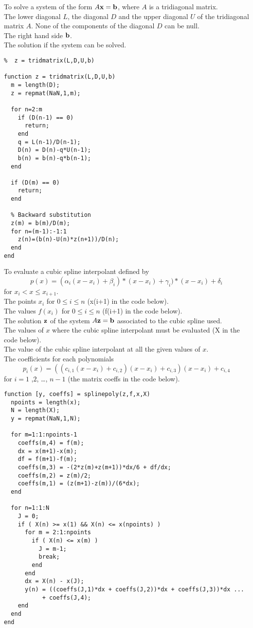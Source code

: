 \begin{code}
To solve a system of the form $A\mathbf{x} = \mathbf{b}$, where $A$ is a
tridiagonal matrix.\\
 The lower diagonal $L$, the diagonal $D$ and the upper
diagonal $U$ of the tridiagonal matrix $A$.  None of the components of
the diagonal $D$ can be null.\\
The right hand side $\mathbf{b}$.\\
 The solution if the system can be solved.
\small
\begin{verbatim}
%  z = tridmatrix(L,D,U,b)

function z = tridmatrix(L,D,U,b)
  m = length(D);
  z = repmat(NaN,1,m);

  for n=2:m
    if (D(n-1) == 0)
      return;
    end
    q = L(n-1)/D(n-1);
    D(n) = D(n)-q*U(n-1);
    b(n) = b(n)-q*b(n-1);
  end

  if (D(m) == 0)
    return;
  end

  % Backward substitution
  z(m) = b(m)/D(m);
  for n=(m-1):-1:1
    z(n)=(b(n)-U(n)*z(n+1))/D(n);
  end
end
\end{verbatim}
\end{code}

\begin{code}
To evaluate a cubic spline interpolant defined by
\[
  p(x) = (\alpha_i(x-x_i) + \beta_i)*(x-x_i) + \gamma_i)*(x-x_i) + \delta_i
\]
for $x_i < x \leq x_{i+1}$.\\
 The points $x_i$ for $0 \leq i \leq n$ (x(i+1) in the
code below).\\
The values $f(x_i)$ for $0 \leq i \leq n$ (f(i+1) in the code
below).\\
The solution $\mathbf{z}$ of the system $A \mathbf{z} = \mathbf{b}$ associated
to the cubic spline used.\\
The values of $x$ where the cubic spline interpolant must
be evaluated (X in the code below).\\
 The value of the cubic spline interpolant at all the
given values of $x$.\\
The coefficients for each polynomials
\[
  p_i(x) = ((c_{i,1} (x-x_i) + c_{i,2})(x-x_i) + c_{i,3})(x-x_i) + c_{i,4}
\]
for $i=1$ ,$2$, \ldots, $n-1$ (the matrix coeffs in the code below).
\small
\begin{verbatim}
function [y, coeffs] = splinepoly(z,f,x,X)
  npoints = length(x);
  N = length(X);
  y = repmat(NaN,1,N);

  for m=1:1:npoints-1
    coeffs(m,4) = f(m);
    dx = x(m+1)-x(m);
    df = f(m+1)-f(m);
    coeffs(m,3) = -(2*z(m)+z(m+1))*dx/6 + df/dx;
    coeffs(m,2) = z(m)/2;
    coeffs(m,1) = (z(m+1)-z(m))/(6*dx);
  end

  for n=1:1:N
    J = 0;
    if ( X(n) >= x(1) && X(n) <= x(npoints) )
      for m = 2:1:npoints
        if ( X(n) <= x(m) )
          J = m-1;
          break;
        end
      end
      dx = X(n) - x(J);
      y(n) = ((coeffs(J,1)*dx + coeffs(J,2))*dx + coeffs(J,3))*dx ...
           + coeffs(J,4);
    end
  end
end
\end{verbatim}
\end{code}

